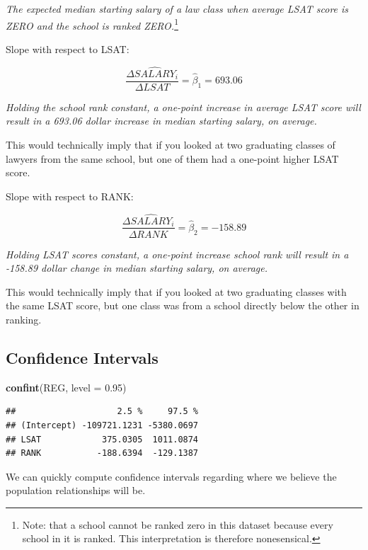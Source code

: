 \documentclass[
]{book}
\newenvironment{Shaded}{\begin{snugshade}}{\end{snugshade}}
\newcommand{\AttributeTok}[1]{\textcolor[rgb]{0.13,0.29,0.53}{#1}}
\newcommand{\FloatTok}[1]{\textcolor[rgb]{0.00,0.00,0.81}{#1}}
\newcommand{\FunctionTok}[1]{\textcolor[rgb]{0.13,0.29,0.53}{\textbf{#1}}}
\newcommand{\NormalTok}[1]{#1}
\begin{document}
\emph{The expected median starting salary of a law class when average LSAT score is ZERO and the school is ranked ZERO.}\footnote{Note: that a school cannot be ranked zero in this dataset because every school in it is ranked. This interpretation is therefore nonesensical.}

\medskip

Slope with respect to LSAT:

\[\frac{\Delta\widehat{SALARY}_i}{\Delta LSAT} = \hat\beta_1 = 693.06\]

\emph{Holding the school rank constant, a one-point increase in average LSAT score will result in a 693.06 dollar increase in median starting salary, on average.}

This would technically imply that if you looked at two graduating classes of lawyers from the same school, but one of them had a one-point higher LSAT score.

\medskip

Slope with respect to RANK:

\[\frac{\Delta\widehat{SALARY}_i}{\Delta RANK} = \hat\beta_2 = -158.89\]

\emph{Holding LSAT scores constant, a one-point increase school rank will result in a -158.89 dollar change in median starting salary, on average.}

This would technically imply that if you looked at two graduating classes with the same LSAT score, but one class was from a school directly below the other in ranking.

\subsection*{Confidence Intervals}\label{confidence-intervals}

\begin{Shaded}
\begin{Highlighting}[]
\FunctionTok{confint}\NormalTok{(REG, }\AttributeTok{level =} \FloatTok{0.95}\NormalTok{)}
\end{Highlighting}
\end{Shaded}

\begin{verbatim}
##                    2.5 %     97.5 %
## (Intercept) -109721.1231 -5380.0697
## LSAT            375.0305  1011.0874
## RANK           -188.6394  -129.1387
\end{verbatim}

We can quickly compute confidence intervals regarding where we believe the population relationships will be.
\end{document}
